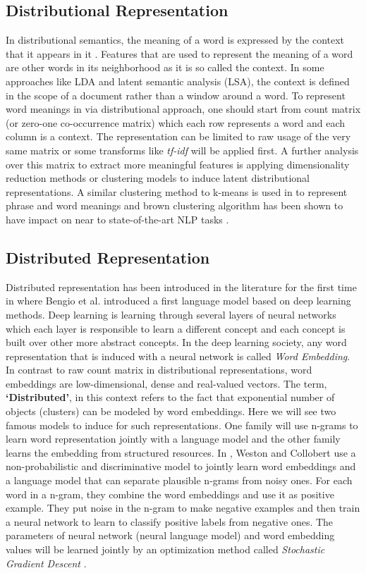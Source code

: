 \subsection{Distributional Representation}
\label{sec:distl-repr}
In distributional semantics, the meaning of a word is expressed by the context
that it appears in it \cite{Harris1981}. Features that are used to represent the
meaning of a word are other words in its neighborhood as it is so called the
context. In some approaches like LDA and latent semantic analysis (LSA), 
the context is defined in the scope of a document rather than a window around a
word. To represent word meanings in via distributional approach, one should
start from count matrix (or zero-one co-occurrence matrix) which each row
represents a word and each column is a context. The representation can be
limited to raw usage of the very same matrix or some transforms like
\emph{tf-idf} will be applied first. A further analysis over this matrix to
extract more meaningful features is applying dimensionality reduction methods or
clustering models to induce latent distributional representations. A similar
clustering method to k-means is used in \cite{Lin2009} to represent phrase and
word meanings and brown clustering algorithm \cite{Brown1992} has been shown to
have impact on near to state-of-the-art NLP tasks \cite{Turian2010b}. 


\subsection{Distributed Representation}
\label{sec:disted-repr}
Distributed representation has been introduced in the literature for the first
time in \cite{Bengio2003} where Bengio et al. introduced a first language
model based on deep learning methods\cite{Bengio2009b}. Deep learning is
learning through several layers of neural networks which each layer is
responsible to learn a different concept and each concept is built over other
more abstract concepts. In the deep learning society, any word representation
that is induced with a neural network is called \emph{Word Embedding}. 
In contrast to raw count matrix in distributional representations, word embeddings are low-dimensional, dense and real-valued vectors.
 The term, \textbf{`Distributed'}, in this context refers to the fact that
 exponential number of objects (clusters) can be modeled by word embeddings.
 Here we will see two famous models to induce for such representations. One
 family will use n-grams to learn word representation jointly with a language
 model and the other family learns the embedding from structured resources.
In \cite{Collobert2008a}, Weston and Collobert use a non-probabilistic and
discriminative model to jointly learn word embeddings and a language model that
can separate plausible n-grams from noisy ones. For each word in a n-gram, they
combine the word embeddings and use it as positive example. They put noise in
the n-gram to make negative examples and then train a neural network to learn to
classify positive labels from negative ones. The parameters of neural network
(neural language model) and word embedding values will be learned jointly by an
optimization method called \emph{Stochastic Gradient Descent} \cite{Bottou2010}.

